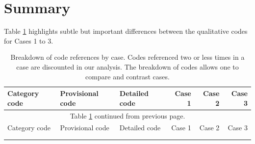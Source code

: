 \section{Summary}


Table \ref{tab:filtered_codes} highlights subtle but important differences between the qualitative codes for Cases 1 to 3.

\begin{landscape}
\footnotesize
\singlespacing

\begin{longtable}[c]{lllrrr}
\caption[Breakdown of codes by case]{Breakdown of code references by case. Codes referenced two or less times in a case are discounted in our analysis. The breakdown of codes allows one to compare and contrast cases.\label{tab:filtered_codes}} \\
\toprule
Category code & Provisional code & Detailed code & Case 1 & Case 2 & Case 3 \\
\endfirsthead

\multicolumn{6}{c}{Table \ref{tab:filtered_codes} continued from previous page.}\\
\toprule
Category code & Provisional code & Detailed code & Case 1 & Case 2 & Case 3 \\
\midrule
\endhead

\bottomrule \\
\endfoot

\bottomrule
\endlastfoot


\end{longtable}
\end{landscape}
